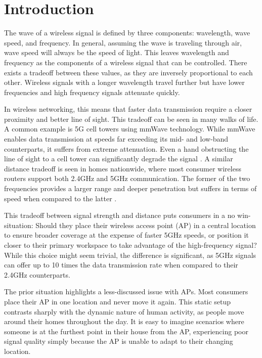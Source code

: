 \section{Introduction}
The wave of a wireless signal is defined by three components: wavelength, wave speed, and frequency. In general, assuming the wave is traveling through air, wave speed will always be the speed of light. This leaves wavelength and frequency as the components of a wireless signal that can be controlled.  There exists a tradeoff between these values, as they are inversely proportional to each other. Wireless signals with a longer wavelength travel further but have lower frequencies and high frequency signals attenuate quickly. 

In wireless networking, this means that faster data transmission require a closer proximity and better line of sight. This tradeoff can be seen in many walks of life. A common example is 5G cell towers using mmWave technology. While mmWave enables data transmission at speeds far exceeding its mid- and low-band counterparts, it suffers from extreme attenuation. Even a hand obstructing the line of sight to a cell tower can significantly degrade the signal \cite{handBlock}. A similar distance tradeoff is seen in homes nationwide, where most consumer wireless routers support both 2.4GHz and 5GHz communication. The former of the two frequencies provides a larger range and deeper penetration but suffers in terms of speed when compared to the latter \cite{wirelessPenetration}. 

This tradeoff between signal strength and distance puts consumers in a no win-situation: Should they place their wireless access point (AP) in a central location to ensure broader coverage at the expense of faster 5GHz speeds, or position it closer to their primary workspace to take advantage of the high-frequency signal? While this choice might seem trivial, the difference is significant, as 5GHz signals can offer up to 10 times the data transmission rate when compared to their 2.4GHz counterparts. 

The prior situation highlights a less-discussed issue with APs. Most consumers place their AP in one location and never move it again. This static setup contrasts sharply with the dynamic nature of human activity, as people move around their homes throughout the day. It is easy to imagine scenarios where someone is at the furthest point in their house from the AP, experiencing poor signal quality simply because the AP is unable to adapt to their changing location.

